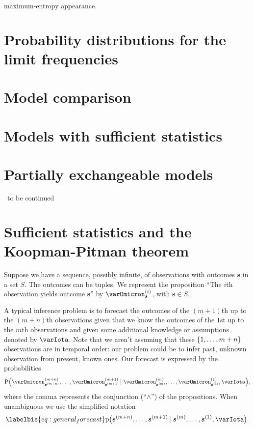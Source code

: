 \documentclass[\ifafour a4paper,12pt,\else a5paper,10pt,\fi%
onecolumn,oneside,article,%
british%
]{memoir}
\theoremstyle{remark}
\theoremstyle{innote}
\DeclarePairedDelimiter\set{\{}{\}}
\newcommand*{\pf}{\mathrm{p}}%
\newcommand*{\p}{\mathrm{P}}%
\renewcommand*{\|}{\nonscript\,\vert\nonscript\;\mathopen{}}
\newcommand*{\puzzle}{{\fontencoding{U}\fontfamily{fontawesometwo}\selectfont\symbol{225}}}
\newcommand{\mynote}[1]{ {\color{notecolour}\puzzle\ #1}}
\newcommand*{\yO}[2]{\varOmicron^{(#1)}_{#2}}
\newcommand*{\yI}{\varIota}
\newcommand*{\ys}{\bm{s}}
\newcommand*{\yso}[1]{\ys^{(#1)}}
\begin{document}
maximum-entropy appearance.

\section{Probability distributions for the limit frequencies}
\label{sec:priors}

\section{Model comparison}
\label{sec:model_comparison}

\section{Models with sufficient statistics}
\label{sec:sufficiency}

\section{Partially exchangeable models}
\label{sec:partially_exch}







\mynote{to be continued}





\iffalse
\section{Sufficient statistics and the Koopman-Pitman theorem}
\label{sec:koopmanpitman}

Suppose we have a sequence, possibly infinite, of observations with
outcomes $\ys$ in a set $S$. The outcomes can be tuples. We represent the
proposition \enquote{The $i$th observation yields outcome $\ys$} by
$\yO{i}{\ys}$, with $\ys\in S$.

A typical inference problem is to forecast the outcomes of the $(m+1)$th up
to the $(m+n)$th observations given that we know the outcomes of the $1$st
up to the $m$th observations and given some additional knowledge or
assumptions denoted by $\yI$. Note that we aren't assuming that these
$\set{1,\dotsc,m+n}$ observations are in temporal order: our problem could be to
infer past, unknown observation from present, known ones. Our forecast is
expressed by the probabilities
\begin{equation}
  \label{eq:general_forecast}
  \p\Bigl(\yO{m+n}{\yso{m+n}}, \dotsc, \yO{m+1}{\yso{m+1}}
  \| \yO{m}{\yso{m}}, \dotsc, \yO{1}{\yso{1}}, \yI\Bigr),
\end{equation}
where the comma represents the conjunction (\enquote{$\land$}) of the
propositions. When unambiguous we use the simplified notation
\begin{equation}\labelbis{eq:general_forecast}
\pf\bigl(\yso{m+n}, \dotsc, \yso{m+1} \| \yso{m}, \dotsc, \yso{1}, \yI\bigr).
\end{equation}
\end{document}

